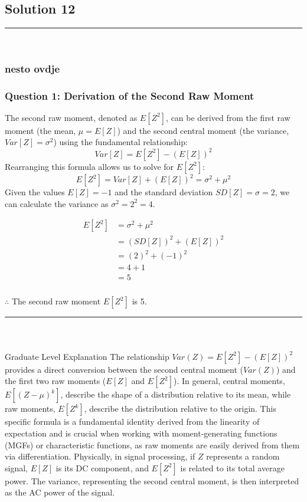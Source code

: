 \documentclass{article}
\begin{document}
\newpage

\subsection*{Solution 12}
\noindent\rule{\textwidth}{0.4pt}\\
\subsubsection*{nesto ovdje}

\subsubsection*{Question 1: Derivation of the Second Raw Moment}

\parbox{\textwidth}{
The second raw moment, denoted as $E[Z^2]$, can be derived from the first raw moment (the mean, $\mu = E[Z]$) and the second central moment (the variance, $Var[Z] = \sigma^2$) using the fundamental relationship:
$$ Var[Z] = E[Z^2] - (E[Z])^2 $$
Rearranging this formula allows us to solve for $E[Z^2]$:
$$ E[Z^2] = Var[Z] + (E[Z])^2 = \sigma^2 + \mu^2 $$
Given the values $E[Z] = -1$ and the standard deviation $SD[Z] = \sigma = 2$, we can calculate the variance as $\sigma^2 = 2^2 = 4$.
}

\begin{align*}
E[Z^2] &= \sigma^2 + \mu^2 \\
&= (SD[Z])^2 + (E[Z])^2 \\
&= (2)^2 + (-1)^2 \\
&= 4 + 1 \\
&= 5
\end{align*}

\subsubsection*{\normalfont}{$\therefore$ The second raw moment $E[Z^2]$ is 5.}

\noindent\rule{\textwidth}{0.4pt}\\

\subsubsection*{\normalfont}{Graduate Level Explanation}
The relationship $Var(Z) = E[Z^2] - (E[Z])^2$ provides a direct conversion between the second central moment ($Var(Z)$) and the first two raw moments ($E[Z]$ and $E[Z^2]$). In general, central moments, $E[(Z-\mu)^k]$, describe the shape of a distribution relative to its mean, while raw moments, $E[Z^k]$, describe the distribution relative to the origin. This specific formula is a fundamental identity derived from the linearity of expectation and is crucial when working with moment-generating functions (MGFs) or characteristic functions, as raw moments are easily derived from them via differentiation. Physically, in signal processing, if $Z$ represents a random signal, $E[Z]$ is its DC component, and $E[Z^2]$ is related to its total average power. The variance, representing the second central moment, is then interpreted as the AC power of the signal.
\end{document}
